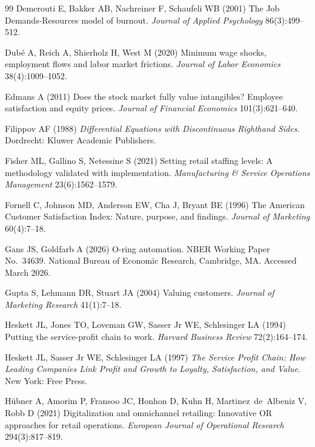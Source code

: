 \documentclass[msom,dblanonrev]{informs4}
\begin{document}
\begin{thebibliography}{99}
Demerouti E, Bakker AB, Nachreiner F, Schaufeli WB (2001) The Job Demands-Resources model of burnout.
\textit{Journal of Applied Psychology} 86(3):499--512.

Dub{\'{e}} A, Reich A, Shierholz H, West M (2020) Minimum wage shocks, employment flows and labor market frictions.
\textit{Journal of Labor Economics} 38(4):1009--1052.

Edmans A (2011) Does the stock market fully value intangibles? Employee satisfaction and equity prices.
\textit{Journal of Financial Economics} 101(3):621--640.

Filippov AF (1988) \textit{Differential Equations with Discontinuous Righthand Sides}.
Dordrecht: Kluwer Academic Publishers.

Fisher ML, Gallino S, Netessine S (2021) Setting retail staffing levels: A methodology validated with implementation.
\textit{Manufacturing \& Service Operations Management} 23(6):1562--1579.

Fornell C, Johnson MD, Anderson EW, Cha J, Bryant BE (1996) The American Customer Satisfaction Index: Nature, purpose, and findings.
\textit{Journal of Marketing} 60(4):7--18.

Gans JS, Goldfarb A (2026) O-ring automation.
NBER Working Paper No.\ 34639. National Bureau of Economic Research, Cambridge, MA. Accessed March 2026.

Gupta S, Lehmann DR, Stuart JA (2004) Valuing customers.
\textit{Journal of Marketing Research} 41(1):7--18.

Heskett JL, Jones TO, Loveman GW, Sasser Jr WE, Schlesinger LA (1994) Putting the service-profit chain to work.
\textit{Harvard Business Review} 72(2):164--174.

Heskett JL, Sasser Jr WE, Schlesinger LA (1997) \textit{The Service Profit Chain: How Leading Companies Link Profit and Growth to Loyalty, Satisfaction, and Value}.
New York: Free Press.

H{\"u}bner A, Amorim P, Fransoo JC, Honhon D, Kuhn H, Martinez~de~Albeniz V, Robb D (2021) Digitalization and omnichannel retailing: Innovative OR approaches for retail operations.
\textit{European Journal of Operational Research} 294(3):817--819.


\end{thebibliography}
\end{document}
